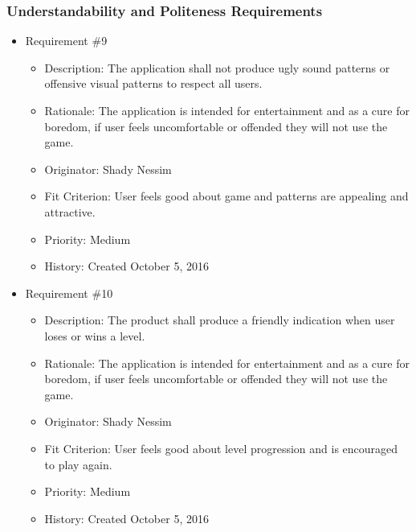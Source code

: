\documentclass[12pt, titlepage]{article}
\begin{document}
\subsubsection{Understandability and Politeness Requirements}
\begin{itemize}

\item Requirement \#9
\begin{itemize}  
\item Description: The application shall not produce ugly sound patterns or offensive visual patterns to respect all users.
\item Rationale: The application is intended for entertainment and as a cure for boredom, if user feels uncomfortable or offended they will not use the game.
\item Originator: Shady Nessim 
\item Fit Criterion: User feels good about game and patterns are appealing and attractive. 
\item Priority: Medium 
\item History: Created October 5, 2016
\end{itemize}

\item Requirement \#10
\begin{itemize} 
\item Description: The product shall produce a friendly indication when user loses or wins a level.
\item Rationale: The application is intended for entertainment and as a cure for boredom, if user feels uncomfortable or offended they will not use the game.
\item Originator: Shady Nessim 
\item Fit Criterion: User feels good about level progression and is encouraged to play again. 
\item Priority: Medium 
\item History: Created October 5, 2016
\end{itemize}

\end{itemize}
\end{document}
